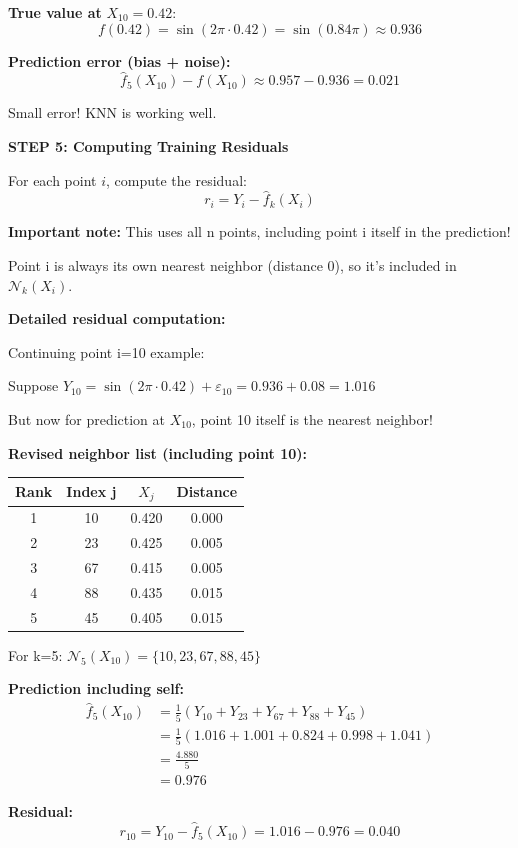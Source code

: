 \documentclass[12pt]{article}
\begin{document}
\begin{solution}
\textbf{True value at } $X_{10} = 0.42$:
\[
f(0.42) = \sin(2\pi \cdot 0.42) = \sin(0.84\pi) \approx 0.936
\]

\textbf{Prediction error (bias + noise):}
\[
\hat{f}_5(X_{10}) - f(X_{10}) \approx 0.957 - 0.936 = 0.021
\]

Small error! KNN is working well.

\textbf{STEP 5: Computing Training Residuals}

For each point $i$, compute the residual:
\[
r_i = Y_i - \hat{f}_k(X_i)
\]

\textbf{Important note:} This uses all n points, including point i itself in the prediction!

Point i is always its own nearest neighbor (distance 0), so it's included in $\mathcal{N}_k(X_i)$.

\textbf{Detailed residual computation:}

Continuing point i=10 example:

Suppose $Y_{10} = \sin(2\pi \cdot 0.42) + \varepsilon_{10} = 0.936 + 0.08 = 1.016$

But now for prediction at $X_{10}$, point 10 itself is the nearest neighbor!

\textbf{Revised neighbor list (including point 10):}

\begin{center}
\begin{tabular}{c|c|c|c}
Rank & Index j & $X_j$ & Distance \\
\hline
1 & 10 & 0.420 & 0.000 \\
2 & 23 & 0.425 & 0.005 \\
3 & 67 & 0.415 & 0.005 \\
4 & 88 & 0.435 & 0.015 \\
5 & 45 & 0.405 & 0.015 \\
\end{tabular}
\end{center}

For k=5: $\mathcal{N}_5(X_{10}) = \{10, 23, 67, 88, 45\}$

\textbf{Prediction including self:}
\begin{align*}
\hat{f}_5(X_{10}) &= \frac{1}{5}(Y_{10} + Y_{23} + Y_{67} + Y_{88} + Y_{45}) \\
&= \frac{1}{5}(1.016 + 1.001 + 0.824 + 0.998 + 1.041) \\
&= \frac{4.880}{5} \\
&= 0.976
\end{align*}

\textbf{Residual:}
\[
r_{10} = Y_{10} - \hat{f}_5(X_{10}) = 1.016 - 0.976 = 0.040
\]


\end{solution}
\end{document}

